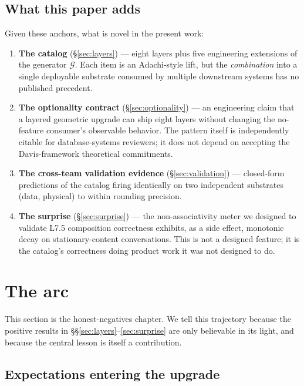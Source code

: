 \documentclass[11pt,letterpaper]{article}
\begin{document}
\subsection{What this paper adds}

Given these anchors, what is novel in the present work:

\begin{enumerate}[nosep]
\item \textbf{The catalog} (\S\ref{sec:layers}) --- eight layers plus
  five engineering extensions of the generator $\mathcal{G}$. Each
  item is an Adachi-style lift, but the \emph{combination} into a
  single deployable substrate consumed by multiple downstream systems
  has no published precedent.
\item \textbf{The optionality contract} (\S\ref{sec:optionality}) ---
  an engineering claim that a layered geometric upgrade can ship
  eight layers without changing the no-feature consumer's observable
  behavior. The pattern itself is independently citable for
  database-systems reviewers; it does not depend on accepting the
  Davis-framework theoretical commitments.
\item \textbf{The cross-team validation evidence}
  (\S\ref{sec:validation}) --- closed-form predictions of the catalog
  firing identically on two independent substrates (data, physical)
  to within rounding precision.
\item \textbf{The surprise} (\S\ref{sec:surprise}) --- the
  non-associativity meter we designed to validate L7.5 composition
  correctness exhibits, as a side effect, monotonic decay on
  stationary-content conversations. This is not a designed feature;
  it is the catalog's correctness doing product work it was not
  designed to do.
\end{enumerate}


\section{The arc}
\label{sec:arc}

This section is the honest-negatives chapter. We tell this trajectory
because the positive results in
\S\S\ref{sec:layers}--\ref{sec:surprise} are only believable in its
light, and because the central lesson is itself a contribution.

\subsection{Expectations entering the upgrade}
\end{document}
